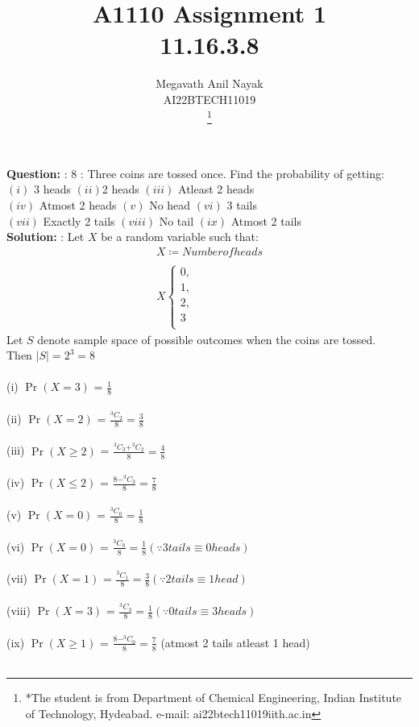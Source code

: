 \documentclass[journal,12pt,two column]{IEEEtran}
\title{A1110 Assignment 1 \\ 11.16.3.8}
\author{Megavath Anil Nayak \\ AI22BTECH11019 \\
        \thanks{*The student is from Department of Chemical Engineering, Indian Institute of Technology, Hydeabad. e-mail: ai22btech11019iith.ac.in}}
\providecommand{\pr}[1]{\ensuremath{\Pr\left(#1\right)}}
\newcommand{\question}{\noindent \textbf{Question: }}
\newcommand{\solution}{\noindent \textbf{Solution: }}
\begin{document}
\maketitle
\question: 8 : Three coins are tossed once. Find the probability of getting:\\
$(i)$ 3 heads  $(ii)$2 heads   $(iii)$ Atleast 2 heads \\
$(iv)$ Atmost 2 heads  $(v)$ No head  $(vi)$ 3 tails  \\
$(vii)$ Exactly 2 tails  $(viii)$ No tail  $(ix)$ Atmost 2 tails \\
\solution : Let $X$ be a random variable such that:
    \begin{align*} 
         X \coloneqq Number of heads \\\\
         X 
         \begin{cases}
            0, \\
            1, \\
            2, \\
            3 \\
         \end{cases}
    \end{align*}
    Let $S$ denote sample space of possible outcomes when the coins are tossed. \\
    Then $\mid S \mid = 2^3 = 8$ \\\\
    (i) \pr{X  = 3} = $\frac{1}{8}$ \\\\
    (ii) \pr{X = 2} = $\frac{^3C_2}{8} = \frac{3}{8}$ \\\\
    (iii) \pr{X \geq 2} = $\frac{^3C_3 + ^3C_2}{8} = \frac{4}{8}$ \\\\
    (iv) \pr{X \leq 2} = $\frac{8 - ^3C_3}{8} = \frac{7}{8}$ \\\\
    (v) \pr{X = 0} = $\frac{^3C_0}{8} = \frac{1}{8}$ \\\\
    (vi) \pr{X = 0} = $\frac{^3C_0}{8} = \frac{1}{8}    (\because 3 tails \equiv 0 heads)$ \\\\
    (vii) \pr{X = 1} = $\frac{^3C_1}{8} = \frac{3}{8}   (\because 2 tails \equiv 1 head)$ \\\\
    (viii) \pr{X = 3} = $\frac{^3C_3}{8} = \frac{1}{8}   (\because 0 tails \equiv 3 heads)$ \\\\
    (ix) \pr{X \geq 1} = $\frac{8 - ^3C_0}{8} = \frac{7}{8}$    (\because atmost 2 tails \equiv atleast 1 head) \\\\ 
\end{document}
